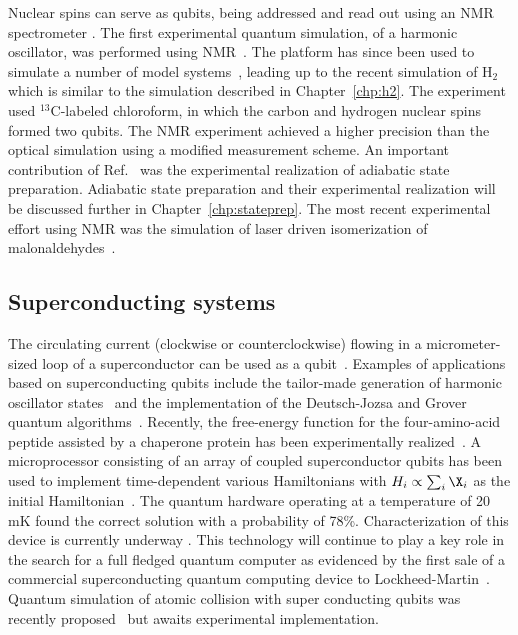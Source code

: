 \documentclass[11pt,oneside,final]{huthesis}%
\begin{document}
Nuclear spins can serve as qubits, being addressed and read out using an NMR
spectrometer \cite{Baugh07}.  The first experimental quantum
simulation, of a harmonic oscillator, was performed using
NMR~\cite{Somaroo99}. The platform has since been used to simulate a number of
model systems~\cite{Negrevergne05,Brown06,Yang06,Peng05},
leading up to the recent simulation of H$_2$ \cite{Du10} which is similar to the simulation described in Chapter~\ref{chp:h2}. The experiment
used $^{13}$C-labeled chloroform, in which the carbon and hydrogen nuclear spins
formed two qubits.  The NMR experiment achieved a higher precision than the optical simulation using a modified measurement scheme.  An important contribution of Ref.~\cite{Du10} was the experimental realization of adiabatic state
preparation.  Adiabatic state preparation and their experimental realization will be discussed further in Chapter~\ref{chp:stateprep}.  The most recent experimental effort using NMR 
was the simulation of laser driven isomerization of malonaldehydes~\cite{Lu11}.

\subsection*{Superconducting systems}
\label{ssec:squids}

The circulating current (clockwise or counterclockwise) flowing in a
micrometer-sized loop of a superconductor can be used as a
qubit~\cite{You05,levi09}. Examples of applications based on superconducting
qubits include the tailor-made generation of harmonic oscillator
states~\cite{Hofheinz09} and the implementation of the Deutsch-Jozsa and
Grover quantum algorithms~\cite{Dicarlo09}. Recently, the free-energy function
 for the four-amino-acid peptide assisted
by a chaperone protein  has been experimentally
realized~\cite{Perdomo11a}. A microprocessor consisting of an array
of coupled superconductor qubits has been used to implement time-dependent
various Hamiltonians with $H_i  \propto \sum_i \X_{i}$ as the
initial Hamiltonian~\cite{kaminsky04,Johnson10,Harris10a}.  The quantum
hardware operating at a temperature of 20 mK found the correct solution with a
probability of 78\%. Characterization of this device is currently underway
\cite{Harris09,Berkley10,Harris10b,Lanting10}. This technology will continue to
play a key role in the search for a full fledged quantum computer as evidenced by
the first sale of a commercial superconducting quantum computing device to Lockheed-Martin~\cite{Merali11}.  Quantum simulation of atomic collision with super
conducting qubits was recently proposed~\cite{Pritchett10} but awaits experimental
implementation.
\end{document}
